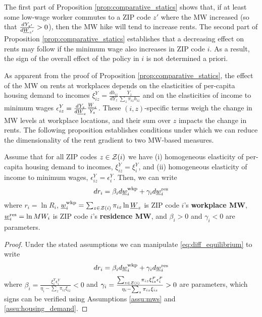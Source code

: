 The first part of Proposition \ref{prop:comparative_statics} shows that,
if at least some low-wage worker commutes to a ZIP code $z'$ where the MW 
increased  (so that $\frac{d Y_{z'}}{d \underline{W}_{z'}}>0$),
then the MW hike will tend to increase rents.
The second part of Proposition \ref{prop:comparative_statics} establishes that 
a decreasing effect on rents may follow if the minimum wage also increases in 
ZIP code $i$.
As a result, the sign of the overall effect of the policy in $i$ is not 
determined a priori.

As apparent from the proof of Proposition \ref{prop:comparative_statics}, 
the effect of the MW on rents at workplaces depends on the elasticities of 
per-capita housing demand to incomes
$\xi^Y_{iz} = \frac{d h_{iz}}{d Y_z} \frac{Y_z}{\sum_z \pi_{iz} h_{iz}}$ and
on the elasticities of income to minimum wages
$\epsilon_{iz}^Y = \frac{d Y_z}{d \underline{W}_z} \frac{\underline{W}_z}{Y_z}$.
These $(i,z)$-specific terms weigh the change in MW levels at workplace locations,
and their sum over $z$ impacts the change in rents.
The following proposition establishes conditions under which we can reduce the 
dimensionality of the rent gradient to two MW-based measures.

\begin{prop}[Representation]\label{prop:representation}
    Assume that for all ZIP codes $z\in\mathcal{Z}(i)$ we have
    (i) homogeneous elasticity of per-capita housing demand to incomes,
    $\xi^Y_{iz}=\xi^Y_{i}$, and
    (ii) homogeneous elasticity of income to minimum wages,
    $\epsilon_{iz}^Y=\epsilon_i^Y$.
    Then, we can write
    $$
    d r_{i} = \beta_i d \underline{w}_{i}^{\text{wkp}} + \gamma_i d \underline{w}^{\text{res}}_i
    $$
    where 
    $r_{i} = \ln R_i$,
    $\underline{w}_{i}^{\text{wkp}} = \sum_{z\in\mathcal{Z}(i)} \pi_{iz} \ln \underline{W}_z$ 
    is ZIP code $i$'s \textbf{workplace MW}, 
    $\underline{w}^{\text{res}}_i = \ln MW_i$ 
    is ZIP code $i$'s \textbf{residence MW}, and 
    $\beta_i > 0$ and $\gamma_i < 0$ are parameters.
\end{prop}
\begin{proof}
    Under the stated assumptions we can manipulate \eqref{eq:diff_equilibrium} 
    to write
    \begin{equation} \label{eq:theory_representation}
        d r_i = \beta_i  d \underline{w}^{\text{wkp}}_i
              + \gamma_i d \underline{w}^{\text{res}}_i
    \end{equation}
    where
    $\beta_i = \frac{\xi_{i}^{Y}\epsilon_i^{Y}}
                     {\eta_{i} - \sum_z \pi_{iz} \xi_{iz}} 
              < 0$ and
    $\gamma_i = \frac{\sum_{z\in\mathcal{Z}(i)}\pi_{iz}\xi_{iz}^{P}\epsilon_{i}^{P}}
                    {\eta_{i} - \sum_z \pi_{iz} \xi_{iz}} 
              > 0$
    are parameters, which signs can be verified using
    Assumptions \ref{assu:mws} and \ref{assu:housing_demand}.
\end{proof}

